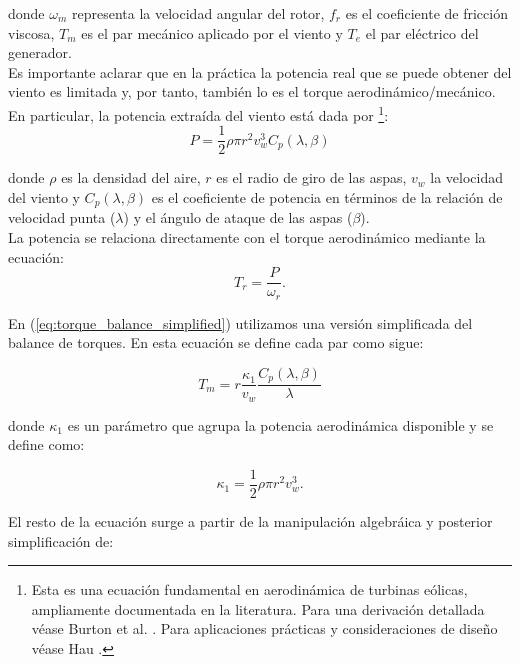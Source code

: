 donde $\omega_m$ representa la velocidad angular del rotor, $f_r$ es el 
coeficiente de fricción viscosa, $T_m$ es el par mecánico aplicado por el 
viento y $T_e$ el par eléctrico del generador.
\\

Es importante aclarar que en la práctica la potencia real que se puede obtener del viento es limitada y, por 
tanto, también lo es el torque aerodinámico/mecánico. En particular, la potencia extraída del viento está dada por
\footnote{Esta es una ecuación fundamental en aerodinámica de turbinas eólicas, ampliamente documentada en 
la literatura. Para una derivación detallada véase Burton et al. \cite{Burton2011}. Para aplicaciones prácticas 
y consideraciones de diseño véase Hau \cite{Hau2013}.}:
\begin{equation}
    P = \frac{1}{2}\rho \pi r^2 v_w^3 C_p(\lambda,\beta)
    \label{eq:aerodynamic_power}
\end{equation}

donde $\rho$ es la densidad del aire, $r$ es el radio de giro de las aspas, 
$v_w$ la velocidad del viento y $C_p(\lambda,\beta)$ es el coeficiente de 
potencia en términos de la relación de velocidad punta ($\lambda$) y el 
ángulo de ataque de las aspas ($\beta$).
\\

La potencia se relaciona directamente con el torque aerodinámico mediante la ecuación:
\begin{equation}
    T_r = \frac{P}{\omega_r}.
    \label{eq:aerodynamic_torque}
\end{equation}

En (\ref{eq:torque_balance_simplified}) utilizamos una versión simplificada del balance de torques. 
En esta ecuación se define cada par como sigue:

\begin{equation}
    T_m = r\frac{\kappa_1}{v_w} \frac{C_p(\lambda,\beta)}{\lambda}
    \label{eq:mechanical_torque}
\end{equation}

donde $\kappa_1$ es un parámetro que agrupa la potencia aerodinámica disponible y se define como: 

\begin{equation}
    \kappa_1 = \frac{1}{2}\rho\pi r^2 v_w^3.
\end{equation}

El resto de la ecuación surge a partir de la manipulación algebráica y posterior simplificación de:

